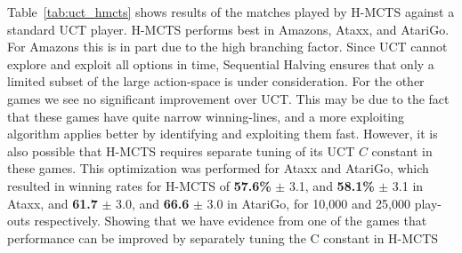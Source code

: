 \documentclass[a4paper]{llncs}
\begin{document}
Table~\ref{tab:uct_hmcts} shows results of the matches played by H-MCTS against a standard UCT player. H-MCTS performs best in Amazons, Ataxx, and AtariGo. For Amazons this is in part due to the high branching factor. Since UCT cannot explore and exploit all options in time, Sequential Halving ensures that only a limited subset of the large action-space is under consideration. For the other games we see no significant improvement over UCT. This may be due to the fact that these games have quite narrow winning-lines, and a more exploiting algorithm applies better by identifying and exploiting them fast. However, it is also possible that H-MCTS requires separate tuning of its UCT $C$ constant in these games. This optimization was performed for Ataxx and AtariGo, which resulted in winning rates for H-MCTS of {\bf{57.6\%}} $\pm$ 3.1, and {\bf{58.1\%}} $\pm$ 3.1 in Ataxx, and {\bf{61.7}} $\pm$ 3.0, and {\bf{66.6}} $\pm$ 3.0 in AtariGo, for 10,000 and 25,000 play-outs respectively. Showing that we have evidence from one of the games that performance can be improved by separately tuning the C constant in H-MCTS

\begin{table}[ht]
\centering
\tabcolsep=0.3cm
\vspace{3mm}
{\caption{H-MCTS vs. SHOT with random play-outs, 1,000 games} \label{tab:shot_hmcts}}
\end{table}
\end{document}
